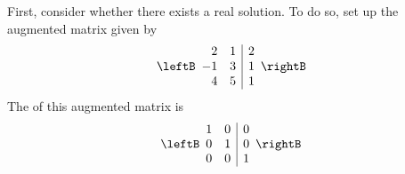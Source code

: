 \begin{solution}
First, consider whether there exists a real solution. To do so, set up the augmented matrix given by
\begin{equation*}
\leftB
\begin{array}{rr|r}
2 & 1 & 2 \\ 
-1 & 3 & 1 \\ 
4 & 5 & 1
\end{array}
\rightB
\end{equation*}
The \rref\; of this augmented matrix is 
\begin{equation*}
\leftB
\begin{array}{rr|r}
1 & 0 & 0 \\ 
0 & 1 & 0 \\ 
0 & 0 & 1
\end{array}
\rightB
\end{equation*}


\end{solution}
